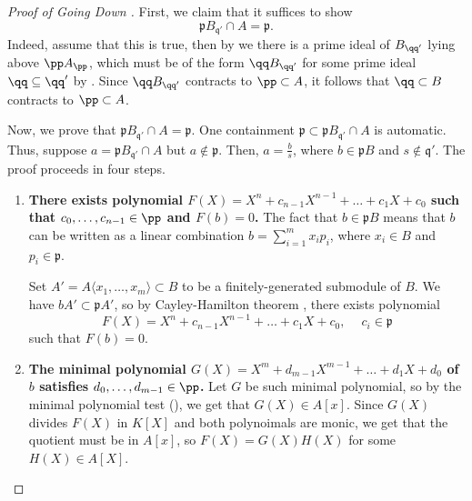 \begin{proof}[Proof of Going Down ]
    First, we claim that it suffices to show
    $$\mathfrak p B_{\mathfrak q'}\cap A = \mathfrak p.$$
    Indeed, assume that this is true,
    then by 
    we there is a prime ideal of $B_{\qq'}$ lying above 
    $\pp A_\pp$, which must be of the form 
    $\qq B_{\qq'}$ for some prime ideal $\qq\subseteq \qq'$
    by .
    Since $\qq B_{\qq'}$ contracts to $\pp\subset A$,
    it follows that $\qq\subset B$ contracts to $\pp\subset A$.

    Now, we prove that $\mathfrak p B_{\mathfrak q'}\cap A
    = \mathfrak p$.
    One containment $\mathfrak p\subset \mathfrak pB_{\mathfrak q'}
    \cap A$ is automatic.
    Thus, suppose $a=\mathfrak pB_{\mathfrak q'}\cap A$
    but $a\notin\mathfrak p$. 
    Then, $a=\frac bs$, where $b\in\mathfrak p B$
    and $s\notin\mathfrak q'$.
    The proof proceeds in four steps.
    \begin{enumerate}
    \item \textbf{There exists polynomial $F(X)
    = X^n + c_{n-1}X^{n-1} + \dots + c_1X+c_0$
    such that $c_0,\dots,c_{n-1}\in\pp$ and $F(b)=0$.}
    The fact that $b\in\mathfrak pB$ means that
    $b$ can be written as a linear combination
    $b = \sum_{i=1}^m x_ip_i$, where $x_i\in B$ and $p_i\in \mathfrak p$.

    Set $A' = A\langle x_1,\dots,x_m\rangle\subset B$
    to be a finitely-generated submodule of $B$.
    We have $bA'\subset\mathfrak pA'$,
    so by Cayley-Hamilton theorem ,
    there exists polynomial
    $$F(X) = X^n + c_{n-1}X^{n-1}+\dots+c_1X+c_0,\ \quad c_i\in\mathfrak p$$
    such that $F(b)=0$.
    \item \textbf{The minimal polynomial $G(X)=X^m + d_{m-1}X^{m-1} + \dots + d_1X+d_0$
    of $b$ satisfies $d_0,\dots,d_{m-1}\in \pp$.}
    Let $G$ be such minimal polynomial, so by the minimal
    polynomial test (),
    we get that $G(X)\in A[x]$.
    Since $G(X)$ divides $F(X)$ in $K[X]$ and both polynoimals
    are monic, we get that the quotient must be in $A[x]$,
    so $F(X) = G(X)H(X)$ for some $H(X)\in A[X]$.


\end{enumerate}
\end{proof}
